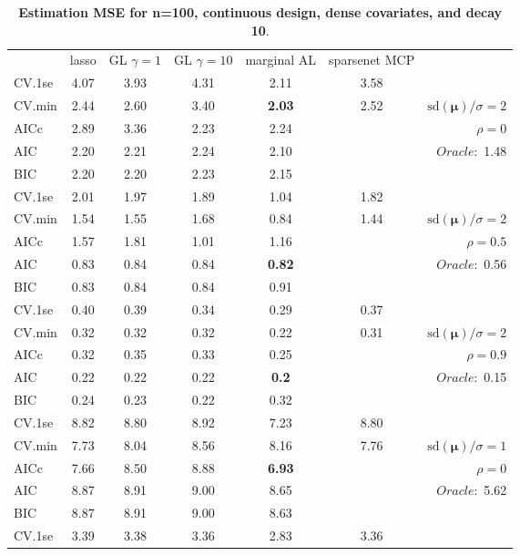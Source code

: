 \begin{table}\vspace{-.5cm}
\caption[l]{ { \bf Estimation MSE for n=100, continuous design, 
dense covariates, and  decay  10}.}
\vspace{-.5cm}
\footnotesize{}
\begin{center}
\begin{tabular}{l*{5}{c}|r}
& lasso & GL $\gamma=1$ & GL $\gamma=10$ & marginal AL & sparsenet MCP  & \\
 \cline{1-7}
CV.1se & 4.07 & 3.93 & 4.31 & 2.11 & 3.58 & \\
CV.min & 2.44 & 2.60 & 3.40 & {\bf 2.03} & 2.52 &  $\mathrm{sd}(\mathbf{\mu})/\sigma=2$ \\
AICc & 2.89 & 3.36 & 2.23 & 2.24 & & $\rho=0$ \\
AIC & 2.20 & 2.21 & 2.24 & 2.10 & &  \multirow{2}{*}{$Oracle: $ 1.48} \\
BIC & 2.20 & 2.20 & 2.23 & 2.15 & &  \\
 \hline 
CV.1se & 2.01 & 1.97 & 1.89 & 1.04 & 1.82 & \\
CV.min & 1.54 & 1.55 & 1.68 & 0.84 & 1.44 &  $\mathrm{sd}(\mathbf{\mu})/\sigma=2$ \\
AICc & 1.57 & 1.81 & 1.01 & 1.16 & & $\rho=0.5$ \\
AIC & 0.83 & 0.84 & 0.84 & {\bf 0.82} & &  \multirow{2}{*}{$Oracle: $ 0.56} \\
BIC & 0.83 & 0.84 & 0.84 & 0.91 & &  \\
 \hline 
CV.1se & 0.40 & 0.39 & 0.34 & 0.29 & 0.37 & \\
CV.min & 0.32 & 0.32 & 0.32 & 0.22 & 0.31 &  $\mathrm{sd}(\mathbf{\mu})/\sigma=2$ \\
AICc & 0.32 & 0.35 & 0.33 & 0.25 & & $\rho=0.9$ \\
AIC & 0.22 & 0.22 & 0.22 & {\bf 0.2} & &  \multirow{2}{*}{$Oracle: $ 0.15} \\
BIC & 0.24 & 0.23 & 0.22 & 0.32 & &  \\
 \hline 
CV.1se & 8.82 & 8.80 & 8.92 & 7.23 & 8.80 & \\
CV.min & 7.73 & 8.04 & 8.56 & 8.16 & 7.76 &  $\mathrm{sd}(\mathbf{\mu})/\sigma=1$ \\
AICc & 7.66 & 8.50 & 8.88 & {\bf 6.93} & & $\rho=0$ \\
AIC & 8.87 & 8.91 & 9.00 & 8.65 & &  \multirow{2}{*}{$Oracle: $ 5.62} \\
BIC & 8.87 & 8.91 & 9.00 & 8.63 & &  \\
 \hline 
CV.1se & 3.39 & 3.38 & 3.36 & 2.83 & 3.36 & \\

\end{tabular}
\end{center}
\end{table}
